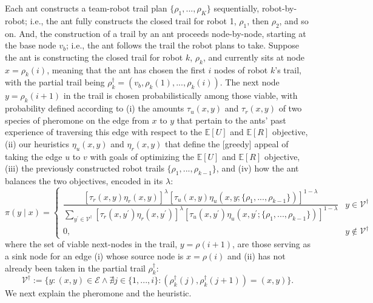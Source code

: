\documentclass[11pt, oneside]{article}
\begin{document}
Each ant constructs a team-robot trail plan $\{\rho_1, ..., \rho_K\}$ sequentially, robot-by-robot; i.e., the ant fully constructs the closed trail for robot 1, $\rho_1$, then $\rho_2$, and so on. And, the construction of a trail by an ant proceeds node-by-node, starting at the base node $v_b$; i.e., the ant follows the trail the robot plans to take. Suppose the ant is constructing the closed trail for robot $k$, $\rho_k$, and currently sits at node $x=\rho_k(i)$, meaning that the ant has chosen the first $i$ nodes of robot $k$'s trail, with the partial trail being $\rho_k^\dagger=(v_b, \rho_k(1), ..., \rho_k(i))$. 
The next node $y=\rho_k(i+1)$ in the trail is chosen probabilistically among those viable, with probability defined according to (i) the amounts $\tau_u(x, y)$ and $\tau_r(x, y)$ of two species of pheromone on the edge from $x$ to $y$ that pertain to the ants' past experience of traversing this edge with respect to the $\mathbb{E}[U]$ and $\mathbb{E}[R]$ objective, (ii) our heuristics $\eta_u(x, y)$ and $\eta_r(x, y)$  that define the [greedy] appeal of taking the edge $u$ to $v$ with goals of optimizing the $\mathbb{E}[U]$ and $\mathbb{E}[R]$ objective, (iii) the previously constructed robot trails $\{\rho_1, ..., \rho_{k-1}\}$, and (iv) how the ant balances the two objectives, encoded in its $\lambda$:
\begin{equation}
	\pi(y \mid x) = 
	\begin{cases}
		\dfrac{
		 \left[\tau_r(x, y) \eta_r(x, y) \right]^\lambda \left[ \tau_u(x, y) \eta_u(x, y; \{\rho_1, ..., \rho_{k-1}\}) \right]^{1-\lambda} }{
		 \sum_{y^\prime \in \mathcal{V}^\dagger} \left[\tau_r(x, y^\prime) \eta_r(x, y^\prime) \right]^\lambda \left[ \tau_u(x, y^\prime) \eta_u(x, y^\prime; \{\rho_1, ..., \rho_{k-1}\}) \right]^{1-\lambda} 
		 }
		 &
		 y \in \mathcal{V}^\dagger
		  \\
		 0, & y \notin \mathcal{V}^\dagger
	\end{cases} \label{eq:prob_x_y}
\end{equation} where the set of viable next-nodes in the trail, $y=\rho(i+1)$, are those serving as a sink node for an edge (i) whose source node is $x=\rho(i)$ and (ii) has not already been taken in the partial trail $\rho_k^\dagger$:
\begin{equation}
 	\mathcal{V}^\dagger := \{ y : (x, y) \in \mathcal{E} \land \nexists j \in \{1, ..., i\} : (\rho_k^\dagger(j), \rho_k^\dagger(j+1))= (x, y)  \}.
\end{equation}
We next explain the pheromone and the heuristic.
\end{document}
